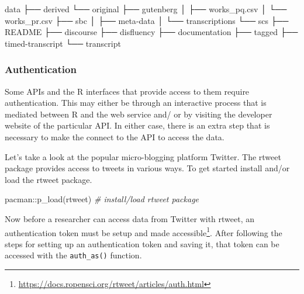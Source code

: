 \documentclass[
]{article}
\newenvironment{Shaded}{\begin{snugshade}}{\end{snugshade}}
\newcommand{\CommentTok}[1]{\textcolor[rgb]{0.56,0.35,0.01}{\textit{#1}}}
\newcommand{\ExtensionTok}[1]{#1}
\newcommand{\FunctionTok}[1]{\textcolor[rgb]{0.00,0.00,0.00}{#1}}
\newcommand{\NormalTok}[1]{#1}
\newcommand{\SpecialCharTok}[1]{\textcolor[rgb]{0.00,0.00,0.00}{#1}}
\DeclareRobustCommand{\href}[2]{#2\footnote{\url{#1}}}
\begin{document}
\begin{Shaded}
\begin{Highlighting}[]
\ExtensionTok{data}
\ExtensionTok{├──}\NormalTok{ derived}
\ExtensionTok{└──}\NormalTok{ original}
    \ExtensionTok{├──}\NormalTok{ gutenberg}
    \ExtensionTok{│}\NormalTok{   ├── works\_pq.csv}
    \ExtensionTok{│}\NormalTok{   └── works\_pr.csv}
    \ExtensionTok{├──}\NormalTok{ sbc}
    \ExtensionTok{│}\NormalTok{   ├── meta{-}data}
    \ExtensionTok{│}\NormalTok{   └── transcriptions}
    \ExtensionTok{└──}\NormalTok{ scs}
        \ExtensionTok{├──}\NormalTok{ README}
        \ExtensionTok{├──}\NormalTok{ discourse}
        \ExtensionTok{├──}\NormalTok{ disfluency}
        \ExtensionTok{├──}\NormalTok{ documentation}
        \ExtensionTok{├──}\NormalTok{ tagged}
        \ExtensionTok{├──}\NormalTok{ timed{-}transcript}
        \ExtensionTok{└──}\NormalTok{ transcript}
\end{Highlighting}
\end{Shaded}

\hypertarget{authentication}{%
\subsubsection{Authentication}\label{authentication}}

Some APIs and the R interfaces that provide access to them require authentication. This may either be through an interactive process that is mediated between R and the web service and/ or by visiting the developer website of the particular API. In either case, there is an extra step that is necessary to make the connect to the API to access the data.

Let's take a look at the popular micro-blogging platform Twitter. The rtweet package \citep{R-rtweet} provides access to tweets in various ways. To get started install and/or load the rtweet package.

\begin{Shaded}
\begin{Highlighting}[]
\NormalTok{pacman}\SpecialCharTok{::}\FunctionTok{p\_load}\NormalTok{(rtweet)  }\CommentTok{\# install/load rtweet package}
\end{Highlighting}
\end{Shaded}

Now before a researcher can access data from Twitter with rtweet, \href{https://docs.ropensci.org/rtweet/articles/auth.html}{an authentication token must be setup and made accessible}. After following the steps for setting up an authentication token and saving it, that token can be accessed with the \texttt{auth\_as()} function.
\end{document}
